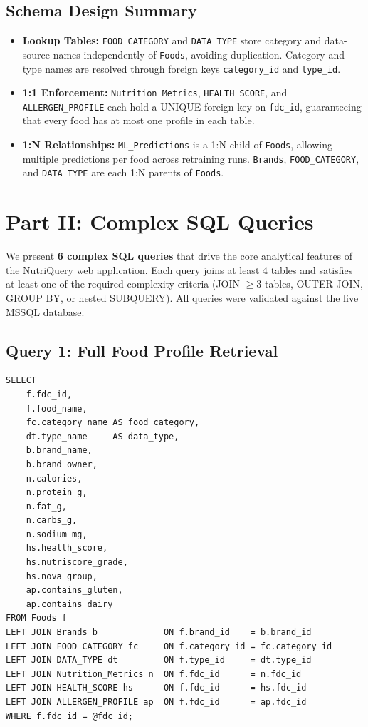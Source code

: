 \documentclass[12pt,a4paper]{article}
\begin{document}
\subsection{Schema Design Summary}
\begin{itemize}
  \item \textbf{Lookup Tables:} \texttt{FOOD\_CATEGORY} and \texttt{DATA\_TYPE} store category and data-source names independently of \texttt{Foods}, avoiding duplication. Category and type names are resolved through foreign keys \texttt{category\_id} and \texttt{type\_id}.
  \item \textbf{1:1 Enforcement:} \texttt{Nutrition\_Metrics}, \texttt{HEALTH\_SCORE}, and \texttt{ALLERGEN\_PROFILE} each hold a UNIQUE foreign key on \texttt{fdc\_id}, guaranteeing that every food has at most one profile in each table.
  \item \textbf{1:N Relationships:} \texttt{ML\_Predictions} is a 1:N child of \texttt{Foods}, allowing multiple predictions per food across retraining runs. \texttt{Brands}, \texttt{FOOD\_CATEGORY}, and \texttt{DATA\_TYPE} are each 1:N parents of \texttt{Foods}.
\end{itemize}


\section{Part II: Complex SQL Queries}

We present \textbf{6 complex SQL queries} that drive the core analytical features of the NutriQuery
web application. Each query joins at least 4 tables and satisfies at least one of the required
complexity criteria (JOIN $\geq$3 tables, OUTER JOIN, GROUP BY, or nested SUBQUERY).
All queries were validated against the live MSSQL database.

\subsection{Query 1: Full Food Profile Retrieval}

\begin{sqlbox}
\small
\begin{verbatim}
SELECT
    f.fdc_id,
    f.food_name,
    fc.category_name AS food_category,
    dt.type_name     AS data_type,
    b.brand_name,
    b.brand_owner,
    n.calories,
    n.protein_g,
    n.fat_g,
    n.carbs_g,
    n.sodium_mg,
    hs.health_score,
    hs.nutriscore_grade,
    hs.nova_group,
    ap.contains_gluten,
    ap.contains_dairy
FROM Foods f
LEFT JOIN Brands b             ON f.brand_id    = b.brand_id
LEFT JOIN FOOD_CATEGORY fc     ON f.category_id = fc.category_id
LEFT JOIN DATA_TYPE dt         ON f.type_id     = dt.type_id
LEFT JOIN Nutrition_Metrics n  ON f.fdc_id      = n.fdc_id
LEFT JOIN HEALTH_SCORE hs      ON f.fdc_id      = hs.fdc_id
LEFT JOIN ALLERGEN_PROFILE ap  ON f.fdc_id      = ap.fdc_id
WHERE f.fdc_id = @fdc_id;
\end{verbatim}
\end{sqlbox}
\end{document}
